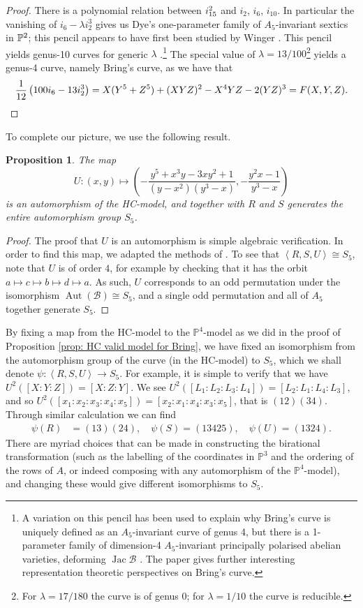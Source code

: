 \documentclass{amsart}
\newtheorem{prop}[theorem]{Proposition}
\DeclareMathOperator{\Aut}{Aut}
\DeclareMathOperator{\Jac}{Jac}
\newcommand{\pround}[1]{\left( #1 \right)}
\newcommand{\pangle}[1]{\left\langle #1 \right\rangle}
\begin{document}
\begin{proof}
There is a polynomial relation between $i_{15}\sp{ 2}$ and $i_2$, $i_6$, $i_{10}$. In particular the vanishing of $i_6-\lambda i_2^3$ gives us Dye's one-parameter family of $A_5$-invariant sextics in $\mathbb{P}\sp2$; this pencil appears to have first been studied by Winger \cite{Winger1925}. This pencil yields genus-10 curves for generic $\lambda$ \cite{Dye1995}.\footnote{A variation on this pencil has been used to explain why Bring's curve is uniquely defined as an $A_5$-invariant curve of genus 4, but there is a 1-parameter family of dimension-4 $A_5$-invariant principally polarised abelian varieties, deforming $\Jac\mathcal{B}$ \cite{Zi2021, Looijenga2021}. The paper \cite{Melliez2003} gives further interesting representation theoretic perspectives on Bring's curve.} The special value of $\lambda=13/100$\footnote{For $\lambda=17/180$ the curve is of genus 0; for $\lambda=1/10$ the curve is reducible.} yields a genus-4 curve, namely Bring's curve, as we have that
$$
\frac1{12}\left(100 i_6-13 i_2\sp{ 3} \right)= X(Y^5+Z^5)+(XYZ)^2-X^4 YZ-2(YZ)^3 = F(X,Y,Z)  .
$$
\end{proof}

To complete our picture, we use the following result. 
\begin{prop}\label{prop: U is an automorphism}
The map 
\[
U:\pround{x,y} \mapsto \pround{-\frac{y^5 + x^3y - 3xy^2 + 1}{(y-x^2)(y^3-x)}, - \frac{y^2x-1}{y^3-x}} 
\]
is an automorphism of the HC-model, and together with $R$ and $S$ generates the entire automorphism group $S_5$. 
\end{prop}
\begin{proof}
The proof that $U$ is an automorphism is simple algebraic verification. In order to find this map, we adapted the methods of \cite{Bruin2019}. To see that $\pangle{R,S,U} \cong S_5$, note that $U$ is of order $4$, for example by checking that it has the orbit $a \mapsto c \mapsto b \mapsto d \mapsto a$. As such, $U$ corresponds to an odd permutation under the isomorphism $\Aut(\mathcal{B}) \cong S_5$, and a single odd permutation and all of $A_5$ together generate $S_5$.  
\end{proof}
By fixing a map from the HC-model to the $\mathbb{P}^4$-model as we did in the proof of Proposition \ref{prop: HC valid model for Bring}, we have fixed an isomorphism from the automorphism group of the curve (in the HC-model) to $S_5$, which we shall denote $\psi : \pangle{R,S,U} \to S_5$. For example, it is simple to verify that we have $U^2([X:Y:Z]) = [X:Z:Y]$. We see $U^2([L_1: L_2: L_3: L_4]) = [L_2 : L_1 : L_4 : L_3]$, and so $U^2([x_1: x_2 : x_3 : x_4 : x_5]) = [x_2 : x_1 : x_4 : x_3 : x_5]$, that is $(12)(34)$. Through similar calculation we can find 
\begin{align*}
    \psi(R) &= (13)(24), \quad
    \psi(S) = (1 3 4 2 5),\quad
    \psi(U) = (1 3 2 4).
\end{align*}There are myriad choices that can be made in constructing the birational transformation (such as the labelling of the coordinates in $\mathbb{P}^3$ and the ordering of the rows of $A$, or indeed composing with any automorphism of the $\mathbb{P}^4$-model), and changing these would give different isomorphisms to $S_5$. 
\end{document}
